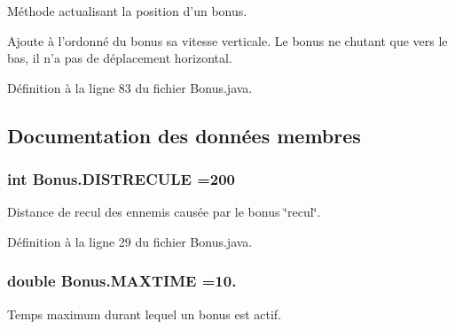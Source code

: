 Méthode actualisant la position d'un bonus. 

Ajoute à l'ordonné du bonus sa vitesse verticale. Le bonus ne chutant que vers le bas, il n'a pas de déplacement horizontal. 

Définition à la ligne 83 du fichier Bonus.\-java.



\subsection{Documentation des données membres}
\hypertarget{class_bonus_ab84109f50f0520fbfb36973c7e937528}{
\subsubsection[{D\-I\-S\-T\-R\-E\-C\-U\-L\-E}]{\setlength{\rightskip}{0pt plus 5cm}int Bonus.\-D\-I\-S\-T\-R\-E\-C\-U\-L\-E =200\hspace{0.3cm}{\ttfamily [static]}}}\label{class_bonus_ab84109f50f0520fbfb36973c7e937528}


Distance de recul des ennemis causée par le bonus \char`\"{}recul\char`\"{}. 


\begin{DoxyItemize}
\item 
\end{DoxyItemize}

Définition à la ligne 29 du fichier Bonus.\-java.

\hypertarget{class_bonus_a7ae08569114898b429584cbcec091c4d}{
\subsubsection[{M\-A\-X\-T\-I\-M\-E}]{\setlength{\rightskip}{0pt plus 5cm}double Bonus.\-M\-A\-X\-T\-I\-M\-E =10.\hspace{0.3cm}{\ttfamily [static]}}}\label{class_bonus_a7ae08569114898b429584cbcec091c4d}


Temps maximum durant lequel un bonus est actif. 


\begin{DoxyItemize}
\item 
\end{DoxyItemize}

